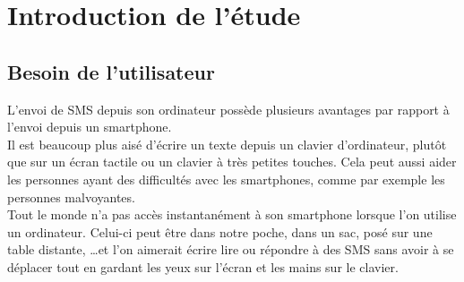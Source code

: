 \cleardoublepage



\chapter{Introduction de l'étude}
\label{Introduction de l'étude}


\section{Besoin de l'utilisateur}

L'envoi de SMS depuis son ordinateur possède plusieurs avantages par rapport à l'envoi depuis un smartphone.
\\


Il est beaucoup plus aisé d'écrire un texte depuis un clavier d'ordinateur, plutôt que sur un écran tactile ou un clavier à très petites touches.
Cela peut aussi aider les personnes ayant des difficultés avec les smartphones, comme par exemple les personnes malvoyantes.
\\


Tout le monde n'a pas accès instantanément à son smartphone lorsque l'on utilise un ordinateur.
Celui-ci peut être dans notre poche, dans un sac, posé sur une table distante, \ldots et l'on aimerait écrire lire ou répondre à des SMS sans avoir à se déplacer tout en gardant les yeux sur l'écran et les mains sur le clavier.
\\






